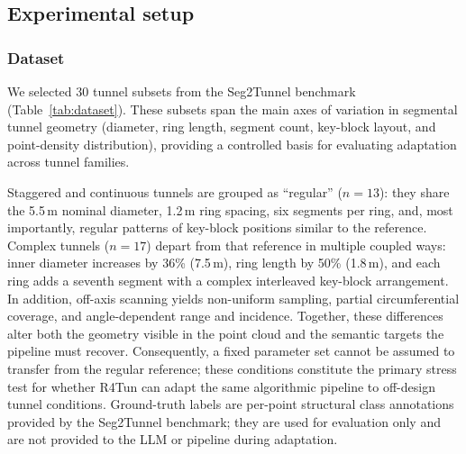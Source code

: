 \documentclass[a4paper,fleqn]{cas-dc}
\begin{document}
\subsection{Experimental setup}\label{sec:exp-setup}

\subsubsection{Dataset}\label{sec:dataset}

We selected 30 tunnel subsets from the Seg2Tunnel benchmark (Table~\ref{tab:dataset}). These subsets span the main axes of variation in segmental tunnel geometry (diameter, ring length, segment count, key-block layout, and point-density distribution), providing a controlled basis for evaluating adaptation across tunnel families.

Staggered and continuous tunnels are grouped as ``regular'' ($n = 13$): they share the 5.5\,m nominal diameter, 1.2\,m ring spacing, six segments per ring, and, most importantly, regular patterns of key-block positions similar to the reference. Complex tunnels ($n = 17$) depart from that reference in multiple coupled ways: inner diameter increases by 36\% (7.5\,m), ring length by 50\% (1.8\,m), and each ring adds a seventh segment with a complex interleaved key-block arrangement. In addition, off-axis scanning yields non-uniform sampling, partial circumferential coverage, and angle-dependent range and incidence. Together, these differences alter both the geometry visible in the point cloud and the semantic targets the pipeline must recover. Consequently, a fixed parameter set cannot be assumed to transfer from the regular reference; these conditions constitute the primary stress test for whether R4Tun can adapt the same algorithmic pipeline to off-design tunnel conditions. Ground-truth labels are per-point structural class annotations provided by the Seg2Tunnel benchmark; they are used for evaluation only and are not provided to the LLM or pipeline during adaptation.
\end{document}
